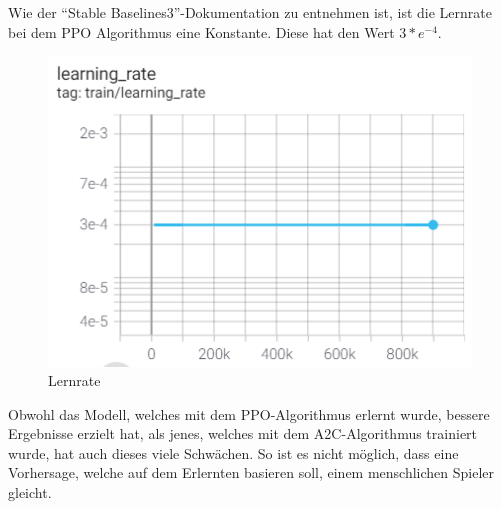 Wie der ``Stable Baselines3''-Dokumentation %
zu entnehmen ist, ist die Lernrate bei dem PPO Algorithmus eine Konstante.
Diese hat den Wert \(3*e^{-4}\).

\begin{figure}[H]
  \centering
  \includegraphics[scale=0.7]{pics/Tensorboard/PPO/learning_rate_new.png}
  \caption{Lernrate}
  \label{fig:ppo:learningrate}
\end{figure}

Obwohl das Modell, welches mit dem PPO-Algorithmus erlernt wurde,
bessere Ergebnisse erzielt hat, als jenes, welches mit dem A2C-Algorithmus trainiert wurde,
hat auch dieses viele Schwächen. So ist es nicht möglich, dass eine Vorhersage, welche
auf dem Erlernten basieren soll, einem menschlichen Spieler gleicht.



